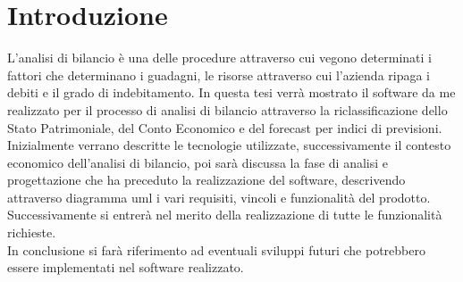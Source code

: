 \chapter*{Introduzione}

L'analisi di bilancio è una delle procedure attraverso cui vegono determinati i fattori che determinano i guadagni, le risorse attraverso cui l'azienda ripaga i debiti e il grado di indebitamento.
In questa tesi verrà mostrato il software da me realizzato per il processo di analisi di bilancio attraverso la riclassificazione dello Stato Patrimoniale, del Conto Economico e del forecast per indici di previsioni.\\
Inizialmente verrano descritte le tecnologie utilizzate, successivamente il contesto economico dell'analisi di bilancio, poi sarà discussa la fase di analisi e progettazione che ha preceduto la realizzazione del software, descrivendo attraverso diagramma \Gls{uml} \cite{uml} i vari requisiti, vincoli e funzionalità del prodotto. \\
Successivamente si entrerà nel merito della realizzazione di tutte le funzionalità richieste. \\
In conclusione si farà riferimento ad eventuali sviluppi futuri che potrebbero essere implementati nel software realizzato.